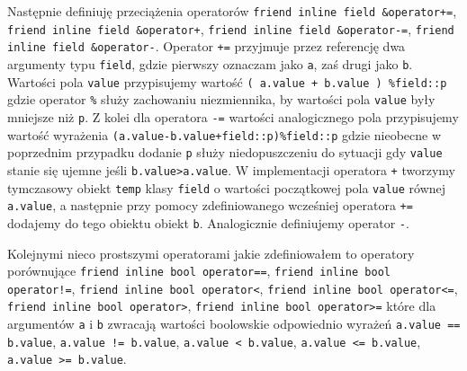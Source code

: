 \documentclass{article}
\begin{document}
Następnie definiuję przeciążenia operatorów 
\texttt{friend inline field \&operator+=},
\texttt{friend inline field \&operator+},
\texttt{friend inline field \&operator-=},
\texttt{friend inline field \&operator-}. Operator
\texttt{+=} przyjmuje przez referencję dwa argumenty typu \texttt{field},
gdzie pierwszy oznaczam jako \texttt{a}, zaś drugi jako \texttt{b}. Wartości pola
\texttt{value} przypisujemy wartość \texttt{( a.value + b.value ) \%field::p} gdzie 
operator \texttt{\%} służy zachowaniu niezmiennika, by wartości pola \texttt{value}
były mniejsze niż \texttt{p}. Z kolei dla operatora \texttt{-=} wartości analogicznego
pola przypisujemy wartość wyrażenia \texttt{(a.value-b.value+field::p)\%field::p}
gdzie nieobecne w poprzednim przypadku dodanie \texttt{p} służy niedopuszczeniu
do sytuacji gdy \texttt{value} stanie się ujemne jeśli \texttt{b.value>a.value}.
W implementacji operatora \texttt{+} tworzymy tymczasowy obiekt \texttt{temp} klasy 
\texttt{field} o wartości
początkowej pola \texttt{value} równej \texttt{a.value}, a następnie
przy pomocy zdefiniowanego wcześniej operatora \texttt{+=} dodajemy do tego obiektu
obiekt \texttt{b}. Analogicznie definiujemy operator \texttt{-}.

Kolejnymi nieco prostszymi operatorami jakie zdefiniowałem to operatory porównujące
\texttt{friend inline bool operator==}, 
\texttt{friend inline bool operator!=}, 
\texttt{friend inline bool operator<},
\texttt{friend inline bool operator<=}, 
\texttt{friend inline bool operator>}, 
\texttt{friend inline bool operator>=} 
które dla argumentów \texttt{a} i \texttt{b} zwracają wartości boolowskie 
odpowiednio wyrażeń 
\texttt{a.value == b.value}, 
\texttt{a.value != b.value},
\texttt{a.value < b.value},
\texttt{a.value <= b.value},
\texttt{a.value >= b.value}.
\end{document}
